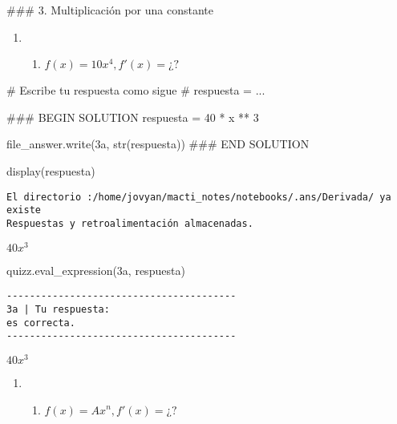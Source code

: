 \documentclass[
  letterpaper,
  DIV=11,
  numbers=noendperiod]{scrreprt}
\newenvironment{Shaded}{\begin{snugshade}}{\end{snugshade}}
\newcommand{\BuiltInTok}[1]{\textcolor[rgb]{0.00,0.23,0.31}{#1}}
\newcommand{\CommentTok}[1]{\textcolor[rgb]{0.37,0.37,0.37}{#1}}
\newcommand{\DecValTok}[1]{\textcolor[rgb]{0.68,0.00,0.00}{#1}}
\newcommand{\NormalTok}[1]{\textcolor[rgb]{0.00,0.23,0.31}{#1}}
\newcommand{\OperatorTok}[1]{\textcolor[rgb]{0.37,0.37,0.37}{#1}}
\newcommand{\RegionMarkerTok}[1]{\textcolor[rgb]{0.00,0.23,0.31}{#1}}
\newcommand{\StringTok}[1]{\textcolor[rgb]{0.13,0.47,0.30}{#1}}
\providecommand{\tightlist}{%
  \setlength{\itemsep}{0pt}\setlength{\parskip}{0pt}}\usepackage{longtable,booktabs,array}
\begin{document}
\#\#\# 3. Multiplicación por una constante

\begin{enumerate}
\def\labelenumi{\arabic{enumi}.}
\setcounter{enumi}{2}
\tightlist
\item
  \begin{enumerate}
  \def\labelenumii{\alph{enumii}.}
  \tightlist
  \item
    \(f(x) = 10x^{4}, f'(x)= ¿?\)
  \end{enumerate}
\end{enumerate}

\begin{Shaded}
\begin{Highlighting}[]
\CommentTok{\# Escribe tu respuesta como sigue }
\CommentTok{\# respuesta = ...}

\CommentTok{\#\#\# }\RegionMarkerTok{BEGIN}\CommentTok{ SOLUTION}
\NormalTok{respuesta }\OperatorTok{=} \DecValTok{40} \OperatorTok{*}\NormalTok{ x }\OperatorTok{**} \DecValTok{3}

\NormalTok{file\_answer.write(}\StringTok{\textquotesingle{}3a\textquotesingle{}}\NormalTok{, }\BuiltInTok{str}\NormalTok{(respuesta))}
\CommentTok{\#\#\# }\RegionMarkerTok{END}\CommentTok{ SOLUTION}

\NormalTok{display(respuesta)}
\end{Highlighting}
\end{Shaded}

\begin{verbatim}
El directorio :/home/jovyan/macti_notes/notebooks/.ans/Derivada/ ya existe
Respuestas y retroalimentación almacenadas.
\end{verbatim}

$\displaystyle 40 x^{3}$

\begin{Shaded}
\begin{Highlighting}[]
\NormalTok{quizz.eval\_expression(}\StringTok{\textquotesingle{}3a\textquotesingle{}}\NormalTok{, respuesta)}
\end{Highlighting}
\end{Shaded}

\begin{verbatim}
----------------------------------------
3a | Tu respuesta:
es correcta.
----------------------------------------
\end{verbatim}

$\displaystyle 40 x^{3}$

\begin{enumerate}
\def\labelenumi{\arabic{enumi}.}
\setcounter{enumi}{2}
\tightlist
\item
  \begin{enumerate}
  \def\labelenumii{\alph{enumii}.}
  \setcounter{enumii}{1}
  \tightlist
  \item
    \(f(x) = Ax^{n}, f'(x) = ¿?\)
  \end{enumerate}
\end{enumerate}
\end{document}
